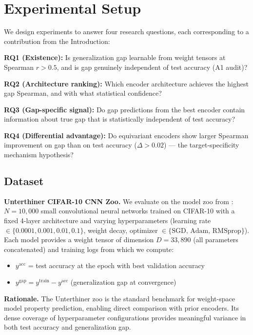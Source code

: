 \section{Experimental Setup}
\label{sec:setup}

We design experiments to answer four research questions, each corresponding to a contribution from the
Introduction:

\textbf{RQ1 (Existence):} Is generalization gap learnable from weight tensors at Spearman $r > 0.5$, and is
gap genuinely independent of test accuracy (A1 audit)?

\textbf{RQ2 (Architecture ranking):} Which encoder architecture achieves the highest gap Spearman, and with
what statistical confidence?

\textbf{RQ3 (Gap-specific signal):} Do gap predictions from the best encoder contain information about true
gap that is statistically independent of test accuracy?

\textbf{RQ4 (Differential advantage):} Do equivariant encoders show larger Spearman improvement on gap than
on test accuracy ($\Delta > 0.02$) --- the target-specificity mechanism hypothesis?

\subsection{Dataset}

\textbf{Unterthiner CIFAR-10 CNN Zoo.} We evaluate on the model zoo from \citet{unterthiner2020}: $N = 10{,}000$
small convolutional neural networks trained on CIFAR-10 with a fixed 4-layer architecture and varying
hyperparameters (learning rate $\in \{0.0001, 0.001, 0.01, 0.1\}$, weight decay, optimizer $\in \{\text{SGD, Adam,
RMSprop}\}$). Each model provides a weight tensor of dimension $D = 33{,}890$ (all parameters concatenated)
and training logs from which we compute:
\begin{itemize}
\item $y^{\text{acc}}$ = test accuracy at the epoch with best validation accuracy
\item $y^{\text{gap}} = y^{\text{train}} - y^{\text{acc}}$ (generalization gap at convergence)
\end{itemize}

\textbf{Rationale.} The Unterthiner zoo is the standard benchmark for weight-space model property prediction,
enabling direct comparison with prior encoders. Its dense coverage of hyperparameter configurations
provides meaningful variance in both test accuracy and generalization gap.

